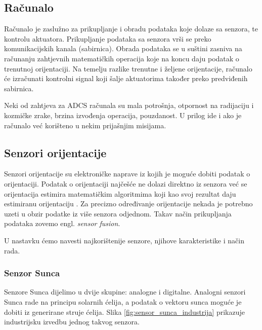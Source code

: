 \documentclass[times, utf8, diplomski, numeric]{templates/template}
\begin{document}
{{        \subsection{Računalo}{
            Računalo je zaslužno za prikupljanje i obradu podataka koje dolaze sa senzora, te kontrolu aktuatora. Prikupljanje podataka sa senzora vrši se preko komunikacijskih kanala (sabirnica). Obrada podataka se u suštini zasniva na računanju zahtjevnih matematičkih operacija koje na koncu daju podatak o trenutnoj orijentaciji. Na temelju razlike trenutne i željene orijentacije, računalo će izračunati kontrolni signal koji šalje aktuatorima također preko predviđenih sabirnica. 

            Neki od zahtjeva za ADCS računala su mala potrošnja, otpornost na radijaciju i kozmičke zrake, brzina izvođenja operacija, pouzdanost. U prilog ide i ako je računalo već korišteno u nekim prijašnjim misijama.
        }

        \subsection{Senzori orijentacije}{
        \label{subsection:senzori_orijentacije}
            Senzori orijentacije su elektroničke naprave iz kojih je moguće dobiti podatak o orijentaciji. Podatak o orijentaciji najčešće ne dolazi direktno iz senzora već se orijentacija estimira matematičkim algoritmima koji kao svoj rezultat daju estimiranu orijentaciju \cite{adcsKnjiga}. Za precizno određivanje orijentacije nekada je potrebno uzeti u obzir podatke iz više senzora odjednom. Takav način prikupljanja podataka zovemo engl. \emph{sensor fusion}. 

            U nastavku ćemo navesti najkorištenije senzore, njihove karakteristike i način rada.

            \subsubsection{Senzor Sunca}{
                Senzore Sunca dijelimo u dvije skupine: analogne i digitalne. Analogni senzori Sunca rade na principu solarnih ćelija, a podatak o vektoru sunca moguće je dobiti iz generirane struje ćelija. Slika \ref{fig:sensor_sunca_industrija} prikazuje industrijsku izvedbu jednog takvog senzora.

}}}}
\end{document}
